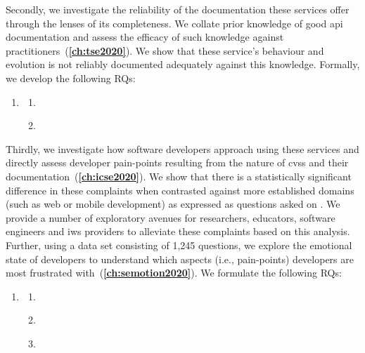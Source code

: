Secondly, we investigate the reliability of the documentation these services offer through the lenses of its completeness. We collate prior knowledge of good \gls{api} documentation and assess the efficacy of such knowledge against practitioners~(\textbf{\cref{ch:tse2020}}). We show that these service's behaviour and evolution is not reliably documented adequately against this knowledge. Formally, we develop the following RQs:

\begin{leftbar}
\begin{enumerate}[label=\faQuestionCircle~~\textbf{RQ\arabic*.}, ref=RQ\arabic*, leftmargin=2.5\parindent, rightmargin=1\parindent,start=2]
    \item \textbf{\RQTwoTextDocumentation{}}\label{rq:docs}
    \begin{enumerate}[label=\textit{RQ2.\arabic*.}, ref=RQ2.\arabic*]
      \item \RQTwoTextDocumentationWhatIsCompleteDocs{} \label{rq:docs:complete}
      \item \RQTwoTextDocumentationMissingAttributes{} \label{rq:docs:missing}
    \end{enumerate}
\end{enumerate}
\end{leftbar}

Thirdly, we investigate how software developers approach using these services and directly assess developer pain-points resulting from the nature of \glspl{cvs} and their documentation~(\textbf{\cref{ch:icse2020}}). We show that there is a statistically significant difference in these complaints when contrasted against more established  domains (such as web or mobile development) as expressed as questions asked on . We provide a number of exploratory avenues for researchers, educators, software engineers and \gls{iws} providers to alleviate these complaints based on this analysis. Further, using a data set consisting of 1,245  questions, we explore the emotional state of developers to understand which aspects (i.e., pain-points) developers are most frustrated with~(\textbf{\cref{ch:semotion2020}}). We formulate the following RQs:

\begin{leftbar}
\begin{enumerate}[label=\faQuestionCircle~~\textbf{RQ\arabic*.}, ref=RQ\arabic*, leftmargin=2.5\parindent, rightmargin=1\parindent,start=3]
  \item \textbf{\RQThreeTextDevMiscomprehension{}}\label{rq:devs}
  \begin{enumerate}[label=\textit{RQ3.\arabic*.}, ref=RQ3.\arabic*]
    \item \RQThreeTextDevMiscomprehensionIssueTypes{} \label{rq:devs:issues}
    \item \RQThreeTextDevMiscomprehensionFrustration{} \label{rq:devs:frustration}
    \item \RQThreeTextDevMiscomprehensionVsConventional{} \label{rq:devs:vs-traditional}
  \end{enumerate}
\end{enumerate}
\end{leftbar}



